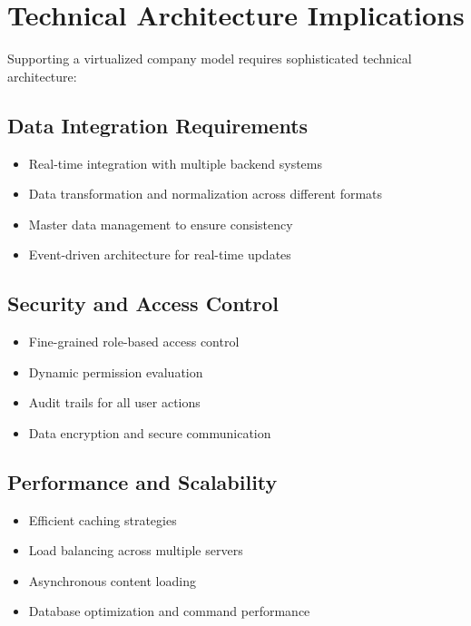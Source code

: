 \section{Technical Architecture Implications}
\label{sec:technical-implications}

Supporting a virtualized company model requires sophisticated technical architecture:

\subsection{Data Integration Requirements}

\begin{itemize}
	\item Real-time integration with multiple backend systems
	\item Data transformation and normalization across different formats
	\item Master data management to ensure consistency
	\item Event-driven architecture for real-time updates
\end{itemize}

\subsection{Security and Access Control}

\begin{itemize}
	\item Fine-grained role-based access control
	\item Dynamic permission evaluation
	\item Audit trails for all user actions
	\item Data encryption and secure communication
\end{itemize}

\subsection{Performance and Scalability}

\begin{itemize}
	\item Efficient caching strategies
	\item Load balancing across multiple servers
	\item Asynchronous content loading
	\item Database optimization and command performance
\end{itemize}

